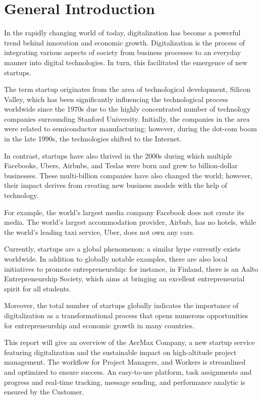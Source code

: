 \thispagestyle{plain} %
\section*{General Introduction}

In the rapidly changing world of today, digitalization has become a powerful trend behind innovation and economic growth.
Digitalization is the process of integrating various aspects of society from business processes to an everyday manner into digital technologies. In turn, this facilitated the emergence of new startups.

The term startup originates from the area of technological development, Silicon Valley, which has been significantly influencing the technological process worldwide since the 1970s due to the highly concentrated number of technology companies surrounding Stanford University. Initially, the companies in the area were related to semiconductor manufacturing; however, during the dot-com boom in the late 1990s, the technologies shifted to the Internet.

In contrast, startups have also thrived in the 2000s during which multiple Facebooks, Ubers, Airbnbs, and Teslas were born and grew to billion-dollar businesses. These multi-billion companies have also changed the world; however, their impact derives from creating new business models with the help of technology.

For example, the world’s largest media company Facebook does not create its media. 
The world’s largest accommodation provider, Airbnb, has no hotels, while the world’s leading taxi service, Uber, does not own any cars.

Currently, startups are a global phenomenon: a similar hype currently exists worldwide.
In addition to globally notable examples, there are also local initiatives to promote entrepreneurship: for instance, in Finland, there is an Aalto Entrepreneurship Society, which aims at bringing an excellent entrepreneurial spirit for all students.

Moreover, the total number of startups globally indicates the importance of digitalization as a transformational process that opens numerous opportunities for entrepreneurship and economic growth in many countries.

This report will give an overview of the AerMax Company, a new startup service featuring digitalization and the sustainable impact on high-altitude project management. The workflow for Project Managers, and Workers is streamlined and optimized to ensure success.
An easy-to-use platform, task assignments and progress and real-time tracking, message sending, and performance analytic is ensured by the Customer. 

\newpage
